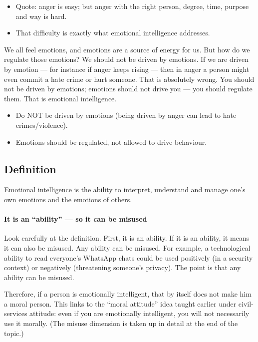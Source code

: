 \begin{KeyConcept}
\begin{itemize}
\item Quote: anger is easy; but anger with the right person, degree, time, purpose and way is hard.
\item That difficulty is exactly what emotional intelligence addresses.
\end{itemize}
\end{KeyConcept}

We all feel emotions, and emotions are a source of energy for us. But how do we regulate those emotions? We should not be driven by emotions. If we are driven by emotion --- for instance if anger keeps rising --- then in anger a person might even commit a hate crime or hurt someone. That is absolutely wrong. You should not be driven by emotions; emotions should not drive you --- you should regulate them. That is emotional intelligence.

\begin{CriticalPoint}
\begin{itemize}
\item Do NOT be driven by emotions (being driven by anger can lead to hate crimes/violence).
\item Emotions should be regulated, not allowed to drive behaviour.
\end{itemize}
\end{CriticalPoint}

\subsection{Definition}

Emotional intelligence is the ability to interpret, understand and manage one's own emotions and the emotions of others.

\paragraph{It is an ``ability'' --- so it can be misused} Look carefully at the definition. First, it is an ability. If it is an ability, it means it can also be misused. Any ability can be misused. For example, a technological ability to read everyone's WhatsApp chats could be used positively (in a security context) or negatively (threatening someone's privacy). The point is that any ability can be misused.

Therefore, if a person is emotionally intelligent, that by itself does not make him a moral person. This links to the ``moral attitude'' idea taught earlier under civil-services attitude: even if you are emotionally intelligent, you will not necessarily use it morally. (The misuse dimension is taken up in detail at the end of the topic.)

